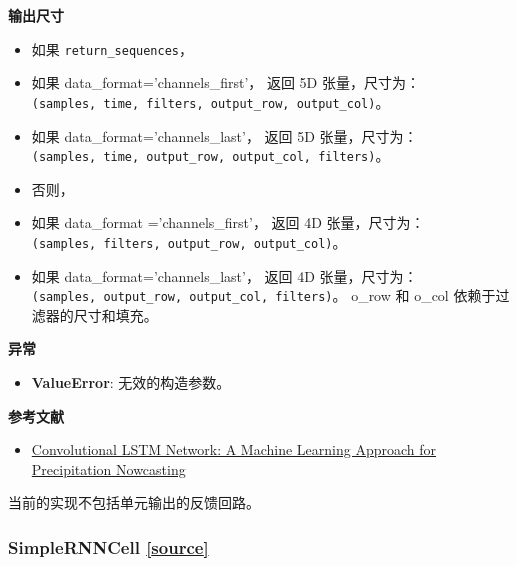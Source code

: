 \textbf{输出尺寸}

\begin{itemize}
\tightlist
\item
  如果 \texttt{return\_sequences}，
\item
  如果 data\_format='channels\_first'， 返回 5D 张量，尺寸为：
  \texttt{(samples,\ time,\ filters,\ output\_row,\ output\_col)}。
\item
  如果 data\_format='channels\_last'， 返回 5D 张量，尺寸为：
  \texttt{(samples,\ time,\ output\_row,\ output\_col,\ filters)}。
\item
  否则，
\item
  如果 data\_format ='channels\_first'， 返回 4D 张量，尺寸为：
  \texttt{(samples,\ filters,\ output\_row,\ output\_col)}。
\item
  如果 data\_format='channels\_last'， 返回 4D 张量，尺寸为：
  \texttt{(samples,\ output\_row,\ output\_col,\ filters)}。 o\_row 和
  o\_col 依赖于过滤器的尺寸和填充。
\end{itemize}

\textbf{异常}

\begin{itemize}
\tightlist
\item
  \textbf{ValueError}: 无效的构造参数。
\end{itemize}

\textbf{参考文献}

\begin{itemize}
\tightlist
\item
  \href{http://arxiv.org/abs/1506.04214v1}{Convolutional LSTM Network: A
  Machine Learning Approach for Precipitation Nowcasting}
\end{itemize}

当前的实现不包括单元输出的反馈回路。




\subsubsection{SimpleRNNCell {\href{https://github.com/keras-team/keras/blob/master/keras/layers/recurrent.py\#L768}{{[}source{]}}}}

